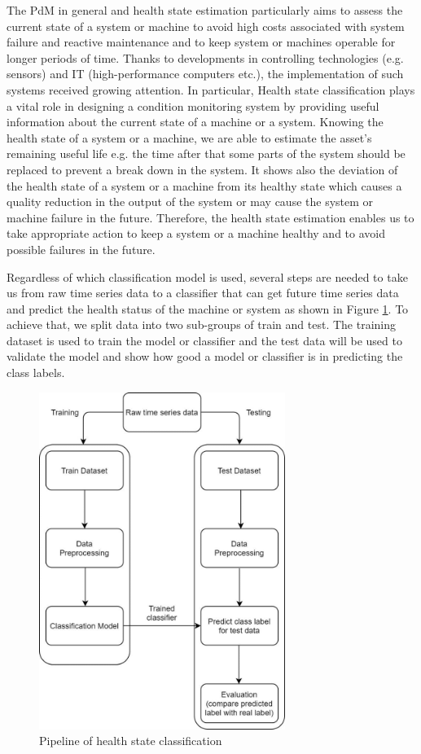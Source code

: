 The PdM in general and health state estimation particularly aims to assess the current state of a system or machine to avoid high costs associated with system failure and reactive maintenance and to keep system or machines operable for longer periods of time. Thanks to developments in controlling technologies (e.g. sensors) and IT (high-performance  computers etc.), the implementation of such systems received growing attention. In particular, Health state classification plays a vital role in designing a condition monitoring system by providing useful information about the current state of a machine or a system. Knowing the health state of a system or a machine, we are able to estimate the asset's remaining useful life e.g. the time after that some parts of the system should be replaced to prevent a break down in the system. It shows also the deviation of the health state of a system or a machine from its healthy state which causes a quality reduction in the output of the system or may cause the system or machine failure in the future. Therefore, the health state estimation enables us to take appropriate action to keep a system or a machine healthy and to avoid possible failures in the future.

Regardless of which classification model is used, several steps are needed to take us from raw time series data to a classifier that can get future time series data and predict the health status of the machine or system as shown in Figure \ref {fig:Pipeline}.
To achieve that, we split data into two sub-groups of train and test. The training dataset is used to train the model or classifier and the test data will be used to validate the model and show how good a model or classifier is in predicting the class labels.

\begin{figure}[H]
    \centering
    \includegraphics[width=8cm]{gfx/Pipeline.png}
    \captionsetup{justification=centering}
    \caption{Pipeline of health state classification}
    \label{fig:Pipeline}
\end{figure}

